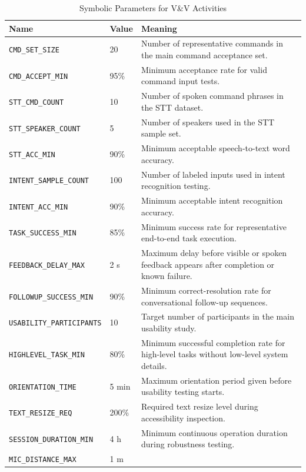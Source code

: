 \documentclass[12pt, titlepage]{article}
\begin{document}
\begin{table}[H]
\centering
\caption{Symbolic Parameters for V\&V Activities}
\label{tab:symbolic-params}
\begin{tabularx}{\textwidth}{|p{5.2cm}|p{2.7cm}|X|}
\hline
\textbf{Name} & \textbf{Value} & \textbf{Meaning} \\
\hline
\texttt{CMD\_SET\_SIZE} & 20 &
Number of representative commands in the main command acceptance set. \\
\hline
\texttt{CMD\_ACCEPT\_MIN} & 95\% &
Minimum acceptance rate for valid command input tests. \\
\hline
\texttt{STT\_CMD\_COUNT} & 10 &
Number of spoken command phrases in the STT dataset. \\
\hline
\texttt{STT\_SPEAKER\_COUNT} & 5 &
Number of speakers used in the STT sample set. \\
\hline
\texttt{STT\_ACC\_MIN} & 90\% &
Minimum acceptable speech-to-text word accuracy. \\
\hline
\texttt{INTENT\_SAMPLE\_COUNT} & 100 &
Number of labeled inputs used in intent recognition testing. \\
\hline
\texttt{INTENT\_ACC\_MIN} & 90\% &
Minimum acceptable intent recognition accuracy. \\
\hline
\texttt{TASK\_SUCCESS\_MIN} & 85\% &
Minimum success rate for representative end-to-end task execution. \\
\hline
\texttt{FEEDBACK\_DELAY\_MAX} & 2 s &
Maximum delay before visible or spoken feedback appears after completion
or known failure. \\
\hline
\texttt{FOLLOWUP\_SUCCESS\_MIN} & 90\% &
Minimum correct-resolution rate for conversational follow-up sequences. \\
\hline
\texttt{USABILITY\_PARTICIPANTS} & 10 &
Target number of participants in the main usability study. \\
\hline
\texttt{HIGHLEVEL\_TASK\_MIN} & 80\% &
Minimum successful completion rate for high-level tasks without low-level
system details. \\
\hline
\texttt{ORIENTATION\_TIME} & 5 min &
Maximum orientation period given before usability testing starts. \\
\hline
\texttt{TEXT\_RESIZE\_REQ} & 200\% &
Required text resize level during accessibility inspection. \\
\hline
\texttt{SESSION\_DURATION\_MIN} & 4 h &
Minimum continuous operation duration during robustness testing. \\
\hline
\texttt{MIC\_DISTANCE\_MAX} & 1 m &

\end{tabularx}
\end{table}
\end{document}
